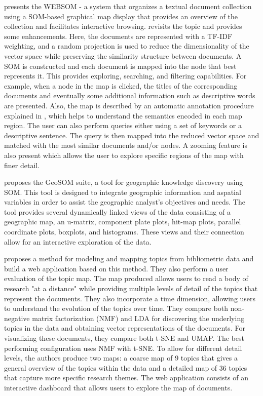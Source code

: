 \documentclass[a4paper]{article}
\begin{document}
\citet{kaski1998} presents the WEBSOM - a system that organizes a textual document collection using a SOM-based graphical map display that provides an overview of the collection and facilitates interactive browsing. \citet{kohonen2013} revisits the topic and provides some enhancements. Here, the documents are represented with a TF-IDF weighting, and a random projection is used to reduce the dimensionality of the vector space while preserving the similarity structure between documents. A SOM is constructed and each document is mapped into the node that best represents it. This provides exploring, searching, and filtering capabilities. For example, when a node in the map is clicked, the titles of the corresponding documents and eventually some additional information such as descriptive words are presented. Also, the map is described by an automatic annotation procedure explained in \citet{lagus1999}, which helps to understand the semantics encoded in each map region. The user can also perform queries either using a set of keywords or a descriptive sentence. The query is then mapped into the reduced vector space and matched with the most similar documents and/or nodes. A zooming feature is also present which allows the user to explore specific regions of the map with finer detail.

\citet{henriques2012} proposes the GeoSOM suite, a tool for geographic knowledge discovery using SOM. This tool is designed to integrate geographic information and aspatial variables in order to assist the geographic analyst's objectives and needs. The tool provides several dynamically linked views of the data consisting of a geographic map, an u-matrix, component plate plots, hit-map plots, parallel coordinate plots, boxplots, and histograms. These views and their connection allow for an interactive exploration of the data.

\citep{lafia2021a} proposes a method for modeling and mapping topics from bibliometric data and build a web application based on this method. They also perform a user evaluation of the topic map. The map produced allows users to read a body of research "at a distance" while providing multiple levels of detail of the topics that represent the documents. They also incorporate a time dimension, allowing users to understand the evolution of the topics over time. They compare both non-negative matrix factorization (NMF) \citep{lee1999} and LDA for discovering the underlying topics in the data and obtaining vector representations of the documents. For visualizing these documents, they compare both t-SNE and UMAP. The best performing configuration uses NMF with t-SNE. To allow for different detail levels, the authors produce two maps: a coarse map of 9 topics that gives a general overview of the topics within the data and a detailed map of 36 topics that capture more specific research themes. The web application consists of an interactive dashboard that allows users to explore the map of documents.
\end{document}
